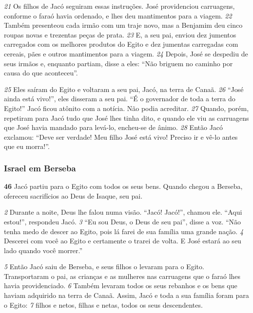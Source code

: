 \bigskip
\textit{\tiny 21}
Os filhos de Jacó
seguiram essas instruções. José providenciou carruagens,
conforme o faraó havia ordenado, e lhes deu mantimentos para a viagem.
\textit{\tiny 22}
Também presenteou cada irmão com um traje novo, mas a Benjamim deu cinco
roupas novas e trezentas peças de prata.
\textit{\tiny 23}
E, a seu pai, enviou dez jumentos
carregados com os melhores produtos do Egito e dez jumentas carregadas com
cereais, pães e outros mantimentos para a viagem.
\textit{\tiny 24}
Depois, José se despediu de seus irmãos e, enquanto partiam, disse a eles:
“Não briguem no caminho por causa do que aconteceu”. 

\bigskip
\textit{\tiny 25}
Eles saíram do Egito e
voltaram a seu pai, Jacó, na terra de Canaã.
\textit{\tiny 26}
“José ainda está vivo!”, eles disseram a seu pai. “É o governador de toda a terra
do Egito!” Jacó ficou atônito com a notícia. Não podia acreditar. 
\textit{\tiny 27}
Quando, porém,
repetiram para Jacó tudo que José lhes tinha dito, e quando ele viu as carruagens
que José havia mandado para levá-lo, encheu-se de ânimo.
\textit{\tiny 28}
Então Jacó exclamou: “Deve ser verdade! Meu filho José está vivo! Preciso ir e
vê-lo antes que eu morra!”.

\bigskip
\subsubsection*{Israel em Berseba}
 \textbf{\large  46} Jacó  partiu para o Egito com todos os seus bens. Quando chegou a
Berseba, ofereceu sacrifícios ao Deus de Isaque, seu pai. 

\bigskip
\textit{\tiny 2} 
Durante a noite, Deus
lhe falou numa visão. “Jacó! Jacó!”, chamou ele.
   “Aqui estou!”, respondeu Jacó. 
\textit{\tiny 3} 
“Eu sou Deus, o Deus de seu pai”, disse a voz. “Não tenha medo de descer ao
Egito, pois lá farei de sua família uma grande nação. 
\textit{\tiny 4} 
Descerei com você ao Egito
e certamente o trarei de volta. E José estará ao seu lado quando você morrer.” 

\bigskip
\textit{\tiny 5} 
Então Jacó saiu de Berseba, e seus filhos o levaram para o Egito.
Transportaram o pai, as crianças e as mulheres nas carruagens que o faraó lhes
havia providenciado. 
\textit{\tiny 6} 
Também levaram todos os seus rebanhos e os bens que
haviam adquirido na terra de Canaã. Assim, Jacó e toda a sua família foram para o
Egito: 
\textit{\tiny 7} 
filhos e netos, filhas e netas, todos os seus descendentes. 

\bigskip
